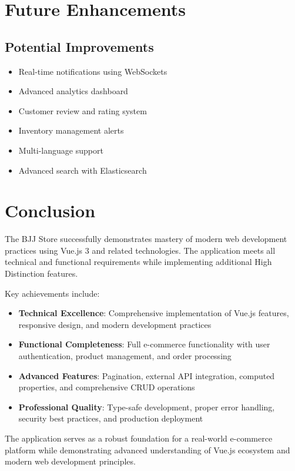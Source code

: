 \documentclass[12pt,a4paper]{article}
\begin{document}
\section{Future Enhancements}

\subsection{Potential Improvements}
\begin{itemize}
    \item Real-time notifications using WebSockets
    \item Advanced analytics dashboard
    \item Customer review and rating system
    \item Inventory management alerts
    \item Multi-language support
    \item Advanced search with Elasticsearch
\end{itemize}

\section{Conclusion}

The BJJ Store successfully demonstrates mastery of modern web development practices using Vue.js 3 and related technologies. The application meets all technical and functional requirements while implementing additional High Distinction features.

Key achievements include:

\begin{itemize}
    \item \textbf{Technical Excellence}: Comprehensive implementation of Vue.js features, responsive design, and modern development practices
    \item \textbf{Functional Completeness}: Full e-commerce functionality with user authentication, product management, and order processing
    \item \textbf{Advanced Features}: Pagination, external API integration, computed properties, and comprehensive CRUD operations
    \item \textbf{Professional Quality}: Type-safe development, proper error handling, security best practices, and production deployment
\end{itemize}

The application serves as a robust foundation for a real-world e-commerce platform while demonstrating advanced understanding of Vue.js ecosystem and modern web development principles.
\end{document}
